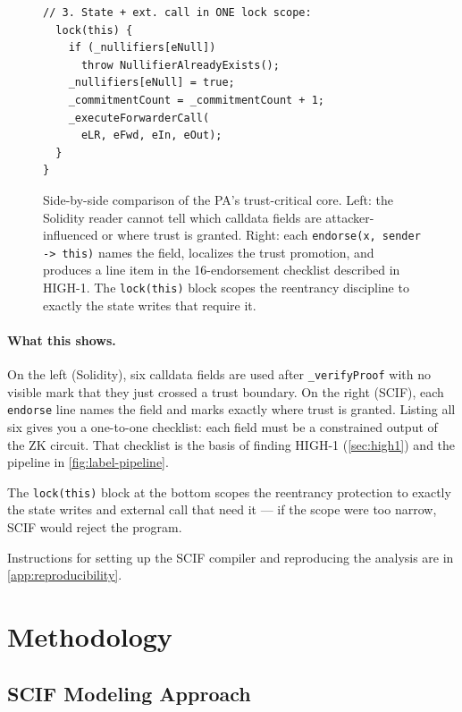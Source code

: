 \documentclass[11pt,a4paper]{article}
\begin{document}
\begin{figure}[h]
\begin{minipage}[t]{0.50\textwidth}
\begin{lstlisting}[style=scifstyleCompact]
  // 3. State + ext. call in ONE lock scope:
  lock(this) {
    if (_nullifiers[eNull])
      throw NullifierAlreadyExists();
    _nullifiers[eNull] = true;
    _commitmentCount = _commitmentCount + 1;
    _executeForwarderCall(
      eLR, eFwd, eIn, eOut);
  }
}
\end{lstlisting}
\end{minipage}
\caption{Side-by-side comparison of the PA's trust-critical core. Left: the
Solidity reader cannot tell which calldata fields are attacker-influenced or
where trust is granted. Right: each \texttt{endorse(x, sender -> this)} names
the field, localizes the trust promotion, and produces a line item in the
16-endorsement checklist described in HIGH-1. The \texttt{lock(this)} block
scopes the reentrancy discipline to exactly the state writes that require
it.}
\label{fig:pa-sidebyside}
\end{figure}

\paragraph{What this shows.}
On the left (Solidity), six calldata fields are used after
\texttt{\_verifyProof} with no visible mark that they just crossed a trust
boundary. On the right (SCIF), each \texttt{endorse} line names the field
and marks exactly where trust is granted. Listing all six gives you a
one-to-one checklist: each field must be a constrained output of the ZK
circuit. That checklist is the basis of finding HIGH-1 (\cref{sec:high1})
and the pipeline in \cref{fig:label-pipeline}.

The \texttt{lock(this)} block at the bottom scopes the reentrancy
protection to exactly the state writes and external call that need it ---
if the scope were too narrow, SCIF would reject the program.

Instructions for setting up the SCIF compiler and reproducing the
analysis are in \cref{app:reproducibility}.

\section{Methodology}
\label{sec:methodology}

\subsection{SCIF Modeling Approach}
\end{document}
